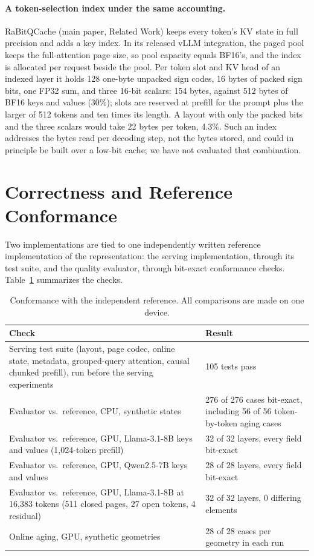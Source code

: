 \documentclass{article}
\begin{document}
\paragraph{A token-selection index under the same accounting.}
RaBitQCache (main paper, Related Work) keeps every token's KV state in full precision and adds a key
index. In its released vLLM integration, the paged pool keeps the full-attention page size, so pool
capacity equals BF16's, and the index is allocated per request beside the pool. Per token slot and KV
head of an indexed layer it holds 128 one-byte unpacked sign codes, 16 bytes of packed sign bits, one
FP32 sum, and three 16-bit scalars: 154 bytes, against 512 bytes of BF16 keys and values (30\%); slots
are reserved at prefill for the prompt plus the larger of 512 tokens and ten times its length. A layout
with only the packed bits and the three scalars would take 22 bytes per token, 4.3\%. Such an index addresses the bytes read per
decoding step, not the bytes stored, and could in principle be built over a low-bit cache; we have not
evaluated that combination.

\section{Correctness and Reference Conformance}
\label{app:conformance}

Two implementations are tied to one independently written reference implementation of the
representation: the serving implementation, through its test suite, and the quality evaluator, through
bit-exact conformance checks. Table~\ref{tab:app-conf} summarizes the checks.

\begin{table}[h]
\centering
\small
\setlength{\tabcolsep}{3pt}
\begin{tabular}{@{}p{}p{}@{}}
\toprule
Check & Result \\
\midrule
Serving test suite (layout, page codec, online state, metadata, grouped-query attention, causal
chunked prefill), run before the serving experiments & 105 tests pass \\
Evaluator vs.\ reference, CPU, synthetic states & 276 of 276 cases bit-exact, including 56 of 56
token-by-token aging cases \\
Evaluator vs.\ reference, GPU, Llama-3.1-8B keys and values (1,024-token prefill) & 32 of 32 layers,
every field bit-exact \\
Evaluator vs.\ reference, GPU, Qwen2.5-7B keys and values & 28 of 28 layers, every field bit-exact \\
Evaluator vs.\ reference, GPU, Llama-3.1-8B at 16,383 tokens (511 closed pages, 27 open tokens, 4
residual) & 32 of 32 layers, 0 differing elements \\
Online aging, GPU, synthetic geometries & 28 of 28 cases per geometry in each run \\
\bottomrule
\end{tabular}
\caption{Conformance with the independent reference. All comparisons are made on one device.}
\label{tab:app-conf}
\end{table}
\end{document}
